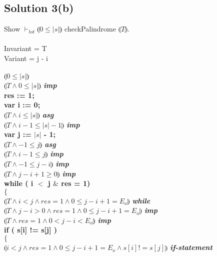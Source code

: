 \documentclass[12pt]{article}
\newcommand\abs[1]{\left|#1\right|}
\begin{document}
\subsection*{Solution 3(b)}
Show $\vdash_{tot} \limg 0 \leq \abs{s} \rimg$ checkPalindrome $\limg T \rimg$. \\ \\
Invariant = T \\
Variant = j - i \\ \\
$\limg 0 \leq \abs{s} \rimg$ \\
$\limg T \land 0 \leq \abs{s} \rimg$ \textit{\textbf{imp}}\\
\textbf{res := 1;} \\
\textbf{var i := 0;} \\
$\limg T \land i \leq \abs{s} \rimg$ \textit{\textbf{asg}}\\
$\limg T \land i - 1 \leq \abs{s} - 1 \rimg$ \textit{\textbf{imp}}\\
\textbf{var j := $\abs{s}$ - 1;} \\
$\limg T \land -1 \leq j \rimg$ \textit{\textbf{asg}} \\
$\limg T \land i-1 \leq j \rimg$ \textit{\textbf{imp}} \\
$\limg T \land -1 \leq j-i \rimg$ \textit{\textbf{imp}} \\
$\limg T \land j - i + 1 \geq 0 \rimg$ \textit{\textbf{imp}}\\
\textbf{while ( i $<$ j $\&$ res = 1)} \\
\textbf{$\{$} \\
\hspace*{10mm}$\limg T \land i < j  \land res = 1 \land 0 \leq j - i + 1 = E_o \rimg$ \textit{\textbf{while}}\\
\hspace*{10mm}$\limg T \land j - i > 0 \land res = 1 \land 0 \leq j - i + 1 = E_o \rimg$ \textit{\textbf{imp}}\\
\hspace*{10mm}$\limg T \land res = 1 \land 0 < j - i < E_o \rimg$ \textit{\textbf{imp}}\\
\hspace*{10mm}\textbf{if ( s[i] != s[j] )} \\
\hspace*{10mm}\textbf{$\{$} \\
\hspace*{20mm}$\limg i < j  \land res = 1 \land 0 \leq j - i + 1 = E_o \land s[i] != s[j] \rimg$ \textit{\textbf{if-statement}}\\
\end{document}
